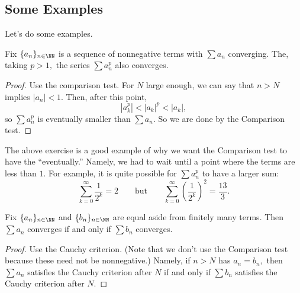\documentclass[../notes.tex]{subfiles}
\begin{document}
\subsection{Some Examples}
Let's do some examples.
\begin{exercise}[Ross 14.7]
	Fix $\{a_n\}_{n\in\NN}$ is a sequence of nonnegative terms with $\sum a_n$ converging. The, taking $p>1,$ the series $\sum a_n^p$ also converges.
\end{exercise}
\begin{proof}
	Use the comparison test. For $N$ large enough, we can say that $n>N$ implies $|a_n|<1.$ Then, after this point,
	\[\left|a_k^p\right|<|a_k|^p<|a_k|,\]
	so $\sum a_n^p$ is eventually smaller than $\sum a_n.$ So we are done by the Comparison test.
\end{proof}
The above exercise is a good example of why we want the Comparison test to have the ``eventually.'' Namely, we had to wait until a point where the terms are less than $1.$ For example, it is quite possible for $\sum a_n^p$ to have a larger sum:
\[\sum_{k=0}^\infty\frac1{2^k}=2\qquad\text{but}\qquad\sum_{k=0}^\infty\left(\frac1{2^k}\right)^2=\frac{13}3.\]
\begin{exercise}[Ross 14.9]
	Fix $\{a_n\}_{n\in\NN}$ and $\{b_n\}_{n\in\NN}$ are equal aside from finitely many terms. Then $\sum a_n$ converges if and only if $\sum b_n$ converges.
\end{exercise}
\begin{proof}
	Use the Cauchy criterion. (Note that we don't use the Comparison test because these need not be nonnegative.) Namely, if $n>N$ has $a_n=b_n,$ then $\sum a_n$ satisfies the Cauchy criterion after $N$ if and only if $\sum b_n$ satisfies the Cauchy criterion after $N.$
\end{proof}
\end{document}
